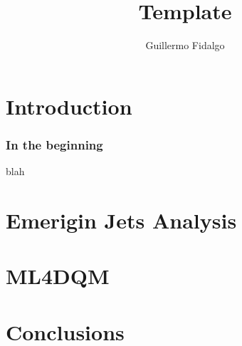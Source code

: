 \documentclass{beamer}
\title{Template}
\author[GAFR]{Guillermo Fidalgo}
\institute[UPRM]{University of Puerto Rico - Mayagüez}
\begin{document}
\maketitle

\section{Introduction}
\begin{frame}
	\frametitle{In the beginning}

	blah

\end{frame}

\section{Emerigin Jets Analysis}


\section{ML4DQM}


\section{Conclusions}
\end{document}
